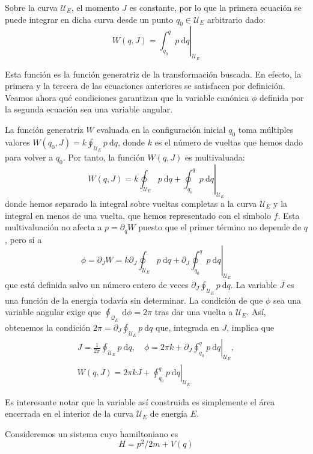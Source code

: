 Sobre la curva $\mathscr{U}_{E}$, el momento $J$ es constante, por lo que la primera ecuación se puede integrar en dicha curva desde un punto $q_{0} \in \mathscr{U}_{E}$ arbitrario dado:
$$
W(q, J)=\left.\int_{q_{0}}^{q} p \mathrm{~d} q\right|_{\mathscr{U}_{E}}
$$

Esta función es la función generatriz de la transformación buscada. En efecto, la primera y la tercera de las ecuaciones anteriores se satisfacen por definición. Veamos ahora qué condiciones garantizan que la variable canónica $\phi$ definida por la segunda ecuación sea una variable angular.

La función generatriz $W$ evaluada en la configuración inicial $q_{0}$ toma múltiples valores $W\left(q_{0}, J\right)=k \oint_{\mathscr{U}_{E}} p \mathrm{~d} q$, donde $k$ es el número de vueltas que hemos dado para volver a $q_{0}$. Por tanto, la función $W(q, J)$ es multivaluada:
$$
W(q, J)=k \oint_{\mathscr{U}_{E}} p \mathrm{~d} q+\left.\oint_{q_{0}}^{q} p \mathrm{~d} q\right|_{\mathscr{U}_{E}}
$$
donde hemos separado la integral sobre vueltas completas a la curva $\mathscr{U}_{E}$ y la integral en menos de una vuelta, que hemos representado con el símbolo $f$. Esta multivaluación no afecta a $p=\partial_{q} W$ puesto que el primer término no depende de $q$, pero sí a
$$
\phi=\partial_{J} W=k \partial_{J} \oint_{\mathscr{U}_{E}} p \mathrm{~d} q+\left.\partial_{J} \oint_{q_{0}}^{q} p \mathrm{~d} q\right|_{\mathscr{U}_{E}}
$$
que está definida salvo un número entero de veces $\partial_{J} \oint_{\mathscr{U}_{E}} p \mathrm{~d} q$.
La variable $J$ es una función de la energía todavía sin determinar. La condición de que $\phi$ sea una variable angular exige que $\oint_{\mathscr{Q}_{E}} \mathrm{~d} \phi=2 \pi$ tras dar una vuelta a $\mathscr{U}_{E}$. Así, obtenemos la condición $2 \pi=\partial_{J} \oint_{\mathscr{U}_{E}} p \mathrm{~d} q$ que, integrada en $J$, implica que
$$
\begin{gathered}
J=\frac{1}{2 \pi} \oint_{\mathscr{U}_{E}} p \mathrm{~d} q, \quad \phi=2 \pi k+\left.\partial_{J} \oint_{q_{0}}^{q} p \mathrm{~d} q\right|_{\mathscr{U}_{E}}, \\
W(q, J)=2 \pi k J+\left.\oint_{q_{0}}^{q} p \mathrm{~d} q\right|_{\mathscr{U}_{E}}
\end{gathered}
$$

Es interesante notar que la variable así construida es simplemente el área encerrada en el interior de la curva $\mathscr{U}_{E}$ de energía $E$.

Consideremos un sistema cuyo hamiltoniano es
$$
H=p^{2} / 2 m+V(q)
$$

